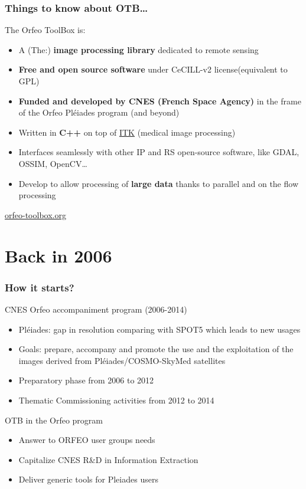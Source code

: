 \documentclass[8pt]{beamer}
\begin{document}
\begin{frame}
\frametitle{Things to know about OTB\ldots}
\begin{block}{The Orfeo ToolBox is:}
\begin{itemize}
\item A (The:) \textbf{image processing library} dedicated to remote sensing
\item \textbf{Free and open source software} under CeCILL-v2 license(equivalent to GPL)
\item \textbf{Funded and developed by CNES (French Space Agency)} in the frame
  of the Orfeo Pléiades program (and beyond)
\item Written in \textbf{C++} on top of \href{www.itk.org}{ITK} (medical image
  processing)
\item Interfaces seamlessly with other IP and RS open-source software, like GDAL, OSSIM, OpenCV\ldots
\item Develop to allow processing of \textbf{large data} thanks to parallel and on the flow processing
\end{itemize}
\end{block}

\begin{center}
{\huge\textcolor{red}{\href{http://www.orfeo-toolbox.org}{orfeo-toolbox.org}}}
\end{center}

\end{frame}

\section{Back in 2006}

\begin{frame}
\frametitle{How it starts?}

\begin{block}{CNES Orfeo accompaniment program (2006-2014)}
\begin{itemize}
\item Pléiades: gap in resolution comparing with SPOT5 which leads to new usages
\item Goals: prepare, accompany and promote the use and the exploitation of the images derived from Pléiades/COSMO-SkyMed satellites
\item Preparatory phase from 2006 to 2012
\item Thematic Commissioning activities from 2012 to 2014
\end{itemize}
\end{block}

\begin{block}{OTB in the Orfeo program}
\begin{itemize}
\item Answer to ORFEO user groups needs
\item Capitalize CNES R\&D in Information Extraction
\item Deliver generic tools for Pleiades users
\end{itemize}
\end{block}
\end{frame}
\end{document}

